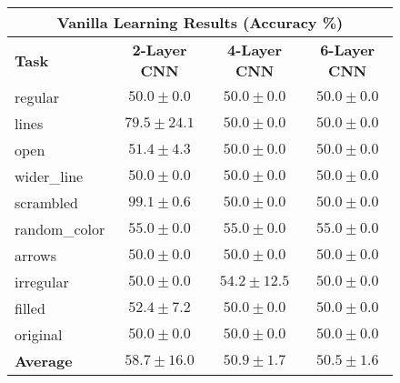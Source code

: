 
\begin{figure}[t]
\centering
\begin{tabular}{|l|c|c|c|}
\hline
\multicolumn{4}{|c|}{\textbf{Vanilla Learning Results (Accuracy \%)}} \\
\hline
\textbf{Task} & \textbf{2-Layer CNN} & \textbf{4-Layer CNN} & \textbf{6-Layer CNN} \\
\hline
regular & $50.0 \pm 0.0$ & $50.0 \pm 0.0$ & $50.0 \pm 0.0$ \\
lines & $79.5 \pm 24.1$ & $50.0 \pm 0.0$ & $50.0 \pm 0.0$ \\
open & $51.4 \pm 4.3$ & $50.0 \pm 0.0$ & $50.0 \pm 0.0$ \\
wider\_line & $50.0 \pm 0.0$ & $50.0 \pm 0.0$ & $50.0 \pm 0.0$ \\
scrambled & $\mathbf{99.1 \pm 0.6}$ & $50.0 \pm 0.0$ & $50.0 \pm 0.0$ \\
random\_color & $55.0 \pm 0.0$ & $55.0 \pm 0.0$ & $55.0 \pm 0.0$ \\
arrows & $50.0 \pm 0.0$ & $50.0 \pm 0.0$ & $50.0 \pm 0.0$ \\
irregular & $50.0 \pm 0.0$ & $54.2 \pm 12.5$ & $50.0 \pm 0.0$ \\
filled & $52.4 \pm 7.2$ & $50.0 \pm 0.0$ & $50.0 \pm 0.0$ \\
original & $50.0 \pm 0.0$ & $50.0 \pm 0.0$ & $50.0 \pm 0.0$ \\
\hline
\textbf{Average} & $58.7 \pm 16.0$ & $50.9 \pm 1.7$ & $50.5 \pm 1.6$ \\
\hline
\end{tabular}

\vspace{0.5cm}


\end{figure}
